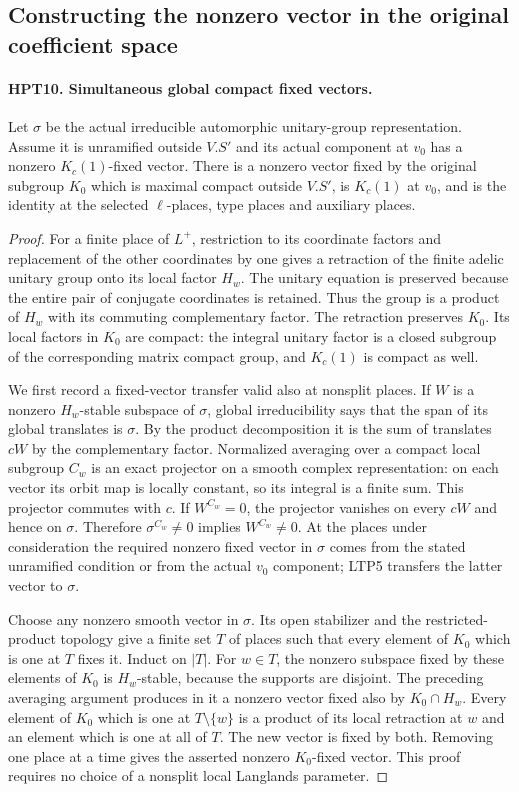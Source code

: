 \documentclass[11pt,a4paper]{article}
\numberwithin{equation}{section}
\theoremstyle{remark}\newtheorem{remark}[theorem]{Remark}
\begin{document}
\subsection{Constructing the nonzero vector in the original coefficient space}

\paragraph{HPT10. Simultaneous global compact fixed vectors.}
\label{claim:HPT10}
Let $\sigma$ be the actual irreducible automorphic unitary-group
representation.  Assume it is unramified outside $V.S'$ and its
actual component at $v_0$ has a nonzero $K_c(1)$-fixed vector.
There is a nonzero vector fixed by the original subgroup $K_0$
which is maximal compact outside $V.S'$, is $K_c(1)$ at $v_0$,
and is the identity at the selected $\ell$-places, type places
and auxiliary places.
\begin{proof}
For a finite place of $L^+$, restriction to its coordinate factors
and replacement of the other coordinates by one gives a retraction
of the finite adelic unitary group onto its local factor $H_w$.
The unitary equation is preserved because the entire pair of
conjugate coordinates is retained.  Thus the group is a product
of $H_w$ with its commuting complementary factor.  The retraction
preserves $K_0$.  Its local factors in $K_0$ are compact: the
integral unitary factor is a closed subgroup of the corresponding
matrix compact group, and $K_c(1)$ is compact as well.

We first record a fixed-vector transfer valid also at nonsplit
places.  If $W$ is a nonzero $H_w$-stable subspace of $\sigma$,
global irreducibility says that the span of its global translates
is $\sigma$.  By the product decomposition it is the sum of
translates $cW$ by the complementary factor.  Normalized averaging
over a compact local subgroup $C_w$ is an exact projector on a
smooth complex representation: on each vector its orbit map is
locally constant, so its integral is a finite sum.  This projector
commutes with $c$.  If $W^{C_w}=0$, the projector vanishes on every
$cW$ and hence on $\sigma$.  Therefore $\sigma^{C_w}\ne0$
implies $W^{C_w}\ne0$.  At the places under consideration the
required nonzero fixed vector in $\sigma$ comes from the stated
unramified condition or from the actual $v_0$ component; LTP5
transfers the latter vector to $\sigma$.

Choose any nonzero smooth vector in $\sigma$.  Its open stabilizer
and the restricted-product topology give a finite set $T$ of
places such that every element of $K_0$ which is one at $T$ fixes
it.  Induct on $|T|$.  For $w\in T$, the nonzero subspace fixed
by these elements of $K_0$ is $H_w$-stable, because the supports
are disjoint.  The preceding averaging argument produces in it
a nonzero vector fixed also by $K_0\cap H_w$.  Every element of
$K_0$ which is one at $T\setminus\{w\}$ is a product of its
local retraction at $w$ and an element which is one at all of $T$.
The new vector is fixed by both.  Removing one place at a time
gives the asserted nonzero $K_0$-fixed vector.  This proof requires
no choice of a nonsplit local Langlands parameter.
\end{proof}
\end{document}
